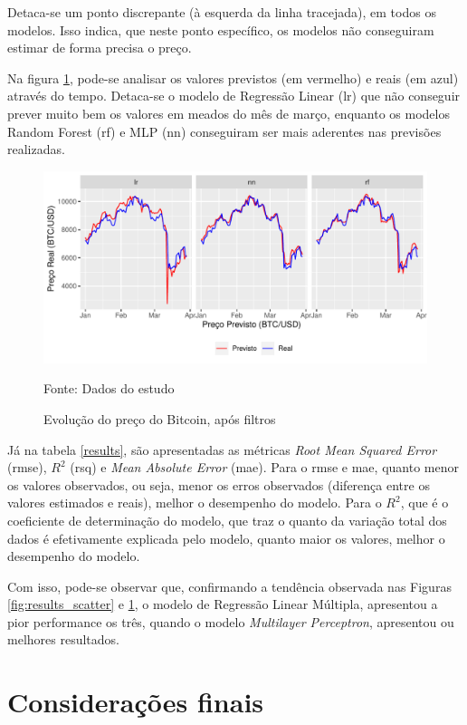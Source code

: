 \documentclass[12pt]{article}
\begin{document}
Detaca-se um ponto discrepante (à esquerda da linha tracejada), em todos os modelos.
Isso indica, que neste ponto específico, os modelos não conseguiram estimar de forma
precisa o preço.


Na figura \ref{fig:results_line}, pode-se analisar os valores previstos (em vermelho)
e reais (em azul) através do tempo. Detaca-se o modelo de Regressão Linear (lr)
que não conseguir prever muito bem os valores em meados do mês de março, enquanto
os modelos Random Forest (rf) e MLP (nn) conseguiram ser mais aderentes nas 
previsões realizadas.

\begin{figure}[!ht]
  \centering
  \includegraphics[scale = 0.8]{img/results_line.pdf}
  \caption{Evolução do preço do Bitcoin, após filtros}
  Fonte: Dados do estudo
  \label{fig:results_line}
\end{figure}

Já na tabela \ref{results}, são apresentadas as métricas \textit{Root Mean 
Squared Error} (rmse), $R^{2}$ (rsq) e \textit{Mean Absolute Error} (mae). Para o 
rmse e mae, quanto menor os valores observados, ou seja, menor os erros 
observados (diferença entre os valores estimados e reais), melhor o desempenho
do modelo. Para o $R^{2}$, que é o coeficiente de determinação do modelo, que 
traz o quanto da variação total dos dados é efetivamente explicada pelo modelo, 
quanto maior os valores, melhor o desempenho do modelo.

Com isso, pode-se observar que, confirmando a tendência observada nas Figuras 
\ref{fig:results_scatter} e \ref{fig:results_line}, o modelo de Regressão Linear
Múltipla, apresentou a pior performance os três, quando o modelo \textit{Multilayer
Perceptron}, apresentou ou melhores resultados.



\section{Considerações finais}
\end{document}

